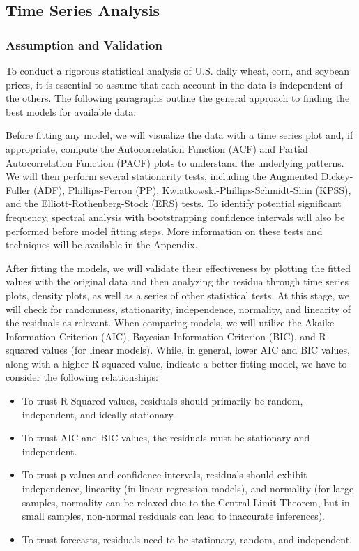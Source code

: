 \documentclass[11pt]{article}
\begin{document}
\subsection{Time Series Analysis}

\subsubsection{Assumption and Validation}

To conduct a rigorous statistical analysis of U.S. daily wheat, corn, and soybean prices, it is essential to assume that each account in the data is independent of the others. The following paragraphs outline the general approach to finding the best models for available data.

Before fitting any model, we will visualize the data with a time series plot and, if appropriate, compute the Autocorrelation Function (ACF) and Partial Autocorrelation Function (PACF) plots to understand the underlying patterns. We will then perform several stationarity tests, including the Augmented Dickey-Fuller (ADF), Phillips-Perron (PP), Kwiatkowski-Phillips-Schmidt-Shin (KPSS), and the Elliott-Rothenberg-Stock (ERS) tests. To identify potential significant frequency, spectral analysis with bootstrapping confidence intervals will also be performed before model fitting steps. More information on these tests and techniques will be available in the Appendix.

After fitting the models, we will validate their effectiveness by plotting the fitted values with the original data and then analyzing the residua through time series plots, density plots, as well as a series of other statistical tests. At this stage, we will check for randomness, stationarity, independence, normality, and linearity of the residuals as relevant. When comparing models, we will utilize the Akaike Information Criterion (AIC), Bayesian Information Criterion (BIC), and R-squared values (for linear models). While, in general, lower AIC and BIC values, along with a higher R-squared value, indicate a better-fitting model, we have to consider the following relationships:

\begin{itemize}
\item To trust R-Squared values, residuals should primarily be random, independent, and ideally stationary.
\item To trust AIC and BIC values, the residuals must be stationary and independent.
\item To trust p-values and confidence intervals, residuals should exhibit independence, linearity (in linear regression models), and normality (for large samples, normality can be relaxed due to the Central Limit Theorem, but in small samples, non-normal residuals can lead to inaccurate inferences).
\item To trust forecasts, residuals need to be stationary, random, and independent.
\end{itemize}
\end{document}
